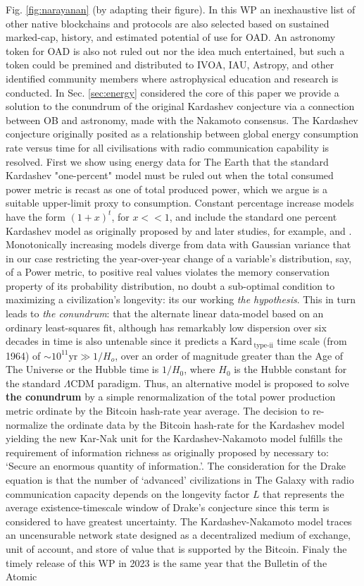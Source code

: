 \documentclass[final,5p,times,twocolumn,authoryear]{elsarticle}
\begin{document}
Fig. \ref{fig:narayanan} (by adapting their figure). In this WP an inexhaustive list of other native blockchains and protocols are also selected based on sustained marked-cap, history, and estimated potential of use for OAD. An astronomy token for OAD is also not ruled out nor the idea much entertained, but such a token could be premined and distributed to IVOA, IAU, Astropy, and other identified community members where astrophysical education and research is conducted. In Sec. \ref{sec:energy} considered the core of this paper we provide a solution to the conundrum of the original Kardashev conjecture via a connection between OB and astronomy, made with the Nakamoto consensus. The Kardashev conjecture originally posited as a relationship between global energy consumption rate versus time for all civilisations with radio communication capability is resolved. First we show using energy data for The Earth that the standard Kardashev "one-percent" model must be ruled out when the total consumed power metric is recast as one of total produced power, which we argue is a suitable upper-limit proxy to consumption. Constant percentage increase models have the form $(1+x)^{t}$, for $x<< 1$, and include the standard one percent Kardashev model as originally proposed by \cite{kar64} and later studies, for example, \cite{sagan73} and \cite{gray2020}. Monotonically increasing models diverge from data with Gaussian variance that in our case restricting the year-over-year change of a variable's distribution, say, of a Power metric, to positive real values violates the memory conservation property of its probability distribution, no doubt a sub-optimal condition to maximizing a civilization's longevity: its our working \textit{the hypothesis}. This in turn leads to \textit{the conundrum}: that the alternate linear data-model based on an ordinary least-squares fit, although has remarkably low dispersion over six decades in time is also untenable since it predicts a Kard$\,_{\textrm{type-ii}}$ time scale (from 1964) of $\sim 10^{11} \textrm{yr} \gg {1/H_o}$, over an order of magnitude greater than the Age of The Universe or the Hubble time is $1/H{_0}$, where $H_{0}$ is the Hubble constant for the standard $\Lambda$CDM paradigm. Thus, an alternative model is proposed to solve \textbf{ the conundrum} by a simple renormalization of the total power production metric ordinate by the Bitcoin hash-rate year average. The decision to re-normalize the ordinate data by the Bitcoin hash-rate for the Kardashev model yielding the new Kar-Nak unit for the Kardashev-Nakamoto model fulfills the requirement of information richness as originally proposed by \cite{kar64} necessary to: `Secure an enormous quantity of information.'. The consideration for the Drake equation is that the number of `advanced' civilizations in The Galaxy with radio communication capacity depends on the longevity factor $L$ that represents the average existence-timescale window of Drake's conjecture since this term is considered to have greatest uncertainty. The Kardashev-Nakamoto model traces an uncensurable network state designed as a decentralized medium of exchange, unit of account, and store of value that is supported by the Bitcoin. Finaly the timely release of this WP in 2023 is the same year that the Bulletin of the Atomic 
\end{document}
